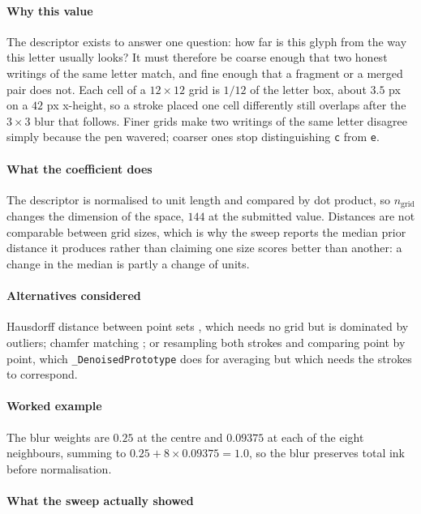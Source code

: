 \paragraph{Why this value}

The descriptor exists to answer one question: how far is this glyph from the way this letter usually looks? It must therefore be coarse enough that two honest writings of the same letter match, and fine enough that a fragment or a merged pair does not. Each cell of a $12\times12$ grid is $1/12$ of the letter box, about $3.5$ px on a $42$ px x-height, so a stroke placed one cell differently still overlaps after the $3\times3$ blur that follows. Finer grids make two writings of the same letter disagree simply because the pen wavered; coarser ones stop distinguishing \texttt{c} from \texttt{e}.

\paragraph{What the coefficient does}

The descriptor is normalised to unit length and compared by dot product, so $n_{\text{grid}}$ changes the dimension of the space, $144$ at the submitted value. Distances are not comparable between grid sizes, which is why the sweep reports the median prior distance it produces rather than claiming one size scores better than another: a change in the median is partly a change of units.

\paragraph{Alternatives considered}

Hausdorff distance between point sets \cite{dubuisson1994}, which needs no grid but is dominated by outliers; chamfer matching \cite{barrow1977}; or resampling both strokes and comparing point by point, which \texttt{\_DenoisedPrototype} does for averaging but which needs the strokes to correspond.

\paragraph{Worked example}

The blur weights are $0.25$ at the centre and $0.09375$ at each of the eight neighbours, summing to $0.25+8 \times 0.09375 = 1.0$, so the blur preserves total ink before normalisation.

\paragraph{What the sweep actually showed}

